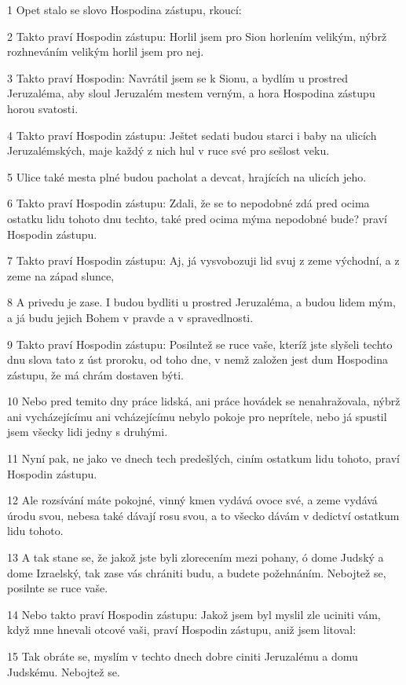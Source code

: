 \par 1 Opet stalo se slovo Hospodina zástupu, rkoucí:
\par 2 Takto praví Hospodin zástupu: Horlil jsem pro Sion horlením velikým, nýbrž rozhneváním velikým horlil jsem pro nej.
\par 3 Takto praví Hospodin: Navrátil jsem se k Sionu, a bydlím u prostred Jeruzaléma, aby sloul Jeruzalém mestem verným, a hora Hospodina zástupu horou svatosti.
\par 4 Takto praví Hospodin zástupu: Ještet sedati budou starci i baby na ulicích Jeruzalémských, maje každý z nich hul v ruce své pro sešlost veku.
\par 5 Ulice také mesta plné budou pacholat a devcat, hrajících na ulicích jeho.
\par 6 Takto praví Hospodin zástupu: Zdali, že se to nepodobné zdá pred ocima ostatku lidu tohoto dnu techto, také pred ocima mýma nepodobné bude? praví Hospodin zástupu.
\par 7 Takto praví Hospodin zástupu: Aj, já vysvobozuji lid svuj z zeme východní, a z zeme na západ slunce,
\par 8 A privedu je zase. I budou bydliti u prostred Jeruzaléma, a budou lidem mým, a já budu jejich Bohem v pravde a v spravedlnosti.
\par 9 Takto praví Hospodin zástupu: Posilntež se ruce vaše, kteríž jste slyšeli techto dnu slova tato z úst proroku, od toho dne, v nemž založen jest dum Hospodina zástupu, že má chrám dostaven býti.
\par 10 Nebo pred temito dny práce lidská, ani práce hovádek se nenahražovala, nýbrž ani vycházejícímu ani vcházejícímu nebylo pokoje pro neprítele, nebo já spustil jsem všecky lidi jedny s druhými.
\par 11 Nyní pak, ne jako ve dnech tech predešlých, ciním ostatkum lidu tohoto, praví Hospodin zástupu.
\par 12 Ale rozsívání máte pokojné, vinný kmen vydává ovoce své, a zeme vydává úrodu svou, nebesa také dávají rosu svou, a to všecko dávám v dedictví ostatkum lidu tohoto.
\par 13 A tak stane se, že jakož jste byli zlorecením mezi pohany, ó dome Judský a dome Izraelský, tak zase vás chrániti budu, a budete požehnáním. Nebojtež se, posilnte se ruce vaše.
\par 14 Nebo takto praví Hospodin zástupu: Jakož jsem byl myslil zle uciniti vám, když mne hnevali otcové vaši, praví Hospodin zástupu, aniž jsem litoval:
\par 15 Tak obráte se, myslím v techto dnech dobre ciniti Jeruzalému a domu Judskému. Nebojtež se.
